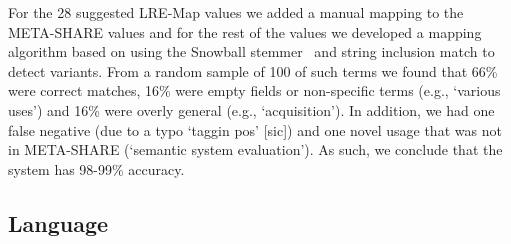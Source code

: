 \documentclass[smallextended]{svjour3}       %
\begin{document}
For the 28 suggested LRE-Map values we added a manual mapping to the META-SHARE
values and for the rest of the values we developed a mapping algorithm based on
using the Snowball stemmer~\cite{} and string inclusion match to detect
variants. From a random sample of 100 of such terms we found that 66\% were
correct matches, 16\% were empty fields or non-specific terms (e.g., `various
uses') and 16\% were overly general (e.g., `acquisition'). In addition, we had
one false negative (due to a typo `taggin pos' [sic]) and one novel usage that
was not in META-SHARE (`semantic system evaluation'). As such, we conclude that
the system has 98-99\% accuracy.

\subsection{Language}

\begin{table}
    \caption{\label{tab:language-comparison}Accuracy of language mappings}
\end{table}
\end{document}
